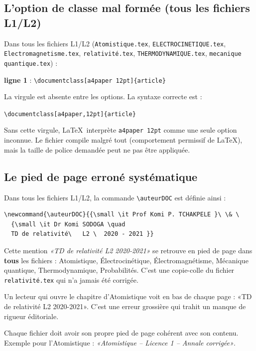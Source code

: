 \documentclass[12pt,a4paper]{article}
\newcommand{\fichier}[1]{\texttt{\small\color{Purple}#1}}
\newcommand{\ligne}[1]{\textbf{ligne #1}}
\begin{document}
\subsection{L'option de classe mal formée (tous les fichiers L1/L2)}

\begin{erreur}
Dans tous les fichiers L1/L2 (\fichier{Atomistique.tex}, \fichier{ELECTROCINETIQUE.tex}, \fichier{Electromagnetisme.tex}, \fichier{relativité.tex}, \fichier{THERMODYNAMIQUE.tex}, \fichier{mecanique quantique.tex}) :

\ligne{1} : \verb|\documentclass[a4paper 12pt]{article}|

La virgule est absente entre les options. La syntaxe correcte est :

\verb|\documentclass[a4paper,12pt]{article}|

Sans cette virgule, \LaTeX\ interprète \verb|a4paper 12pt| comme une seule option inconnue. Le fichier compile malgré tout (comportement permissif de \LaTeX), mais la taille de police demandée peut ne pas être appliquée.
\end{erreur}

\subsection{Le pied de page erroné systématique}\label{subsec:entete}

\begin{erreur}
Dans tous les fichiers L1/L2, la commande \verb|\auteurDOC| est définie ainsi :

\begin{verbatim}
\newcommand{\auteurDOC}{{\small \it Prof Komi P. TCHAKPELE }\ \& \
  {\small \it Dr Komi SODOGA \quad
  TD de relativité\   L2 \  2020 - 2021 }}
\end{verbatim}

Cette mention \textit{«TD de relativité L2 2020-2021»} se retrouve en pied de page dans \textbf{tous} les fichiers : Atomistique, Électrocinétique, Électromagnétisme, Mécanique quantique, Thermodynamique, Probabilités. C'est une copie-colle du fichier \fichier{relativité.tex} qui n'a jamais été corrigée.

Un lecteur qui ouvre le chapitre d'Atomistique voit en bas de chaque page : «TD de relativité L2 2020-2021». C'est une erreur grossière qui trahit un manque de rigueur éditoriale.
\end{erreur}

\begin{recommandation}
Chaque fichier doit avoir son propre pied de page cohérent avec son contenu. Exemple pour l'Atomistique : \textit{«Atomistique -- Licence 1 -- Annale corrigée»}.
\end{recommandation}
\end{document}
